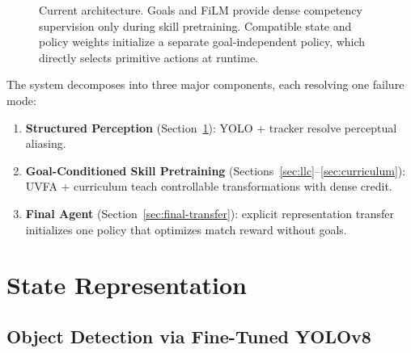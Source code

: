 \documentclass[11pt,a4paper]{article}
\begin{document}
\begin{figure}[t]
\caption{Current architecture. Goals and FiLM provide dense competency supervision only during skill pretraining. Compatible state and policy weights initialize a separate goal-independent policy, which directly selects primitive actions at runtime.}
\label{fig:architecture}
\end{figure}

The system decomposes into three major components, each resolving one failure mode:
\begin{enumerate}[leftmargin=1.5em]
    \item \textbf{Structured Perception} (Section~\ref{sec:state-representation}): YOLO + tracker resolve perceptual aliasing.
    \item \textbf{Goal-Conditioned Skill Pretraining} (Sections~\ref{sec:llc}--\ref{sec:curriculum}): UVFA + curriculum teach controllable transformations with dense credit.
    \item \textbf{Final Agent} (Section~\ref{sec:final-transfer}): explicit representation transfer initializes one policy that optimizes match reward without goals.
\end{enumerate}

\section{State Representation}
\label{sec:state-representation}

\subsection{Object Detection via Fine-Tuned YOLOv8}
\label{sec:yolo}
\end{document}
